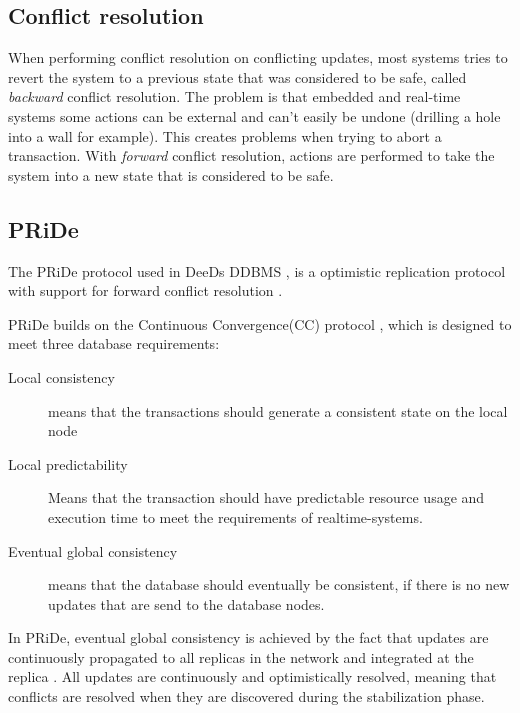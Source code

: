\subsection{Conflict resolution} %
\label{sub:conflict_resolution}

When performing conflict resolution on conflicting updates, most systems tries to revert the system to a previous state that was considered to be safe, called \emph{backward} conflict resolution. The problem is that embedded and real-time systems some actions can be external and can't easily be undone (drilling a hole into a wall for example). This creates problems when trying to abort a transaction. 
With \emph{forward} conflict resolution, actions are performed to take the system into a new state that is considered to be safe.      


\subsection{PRiDe}
\label{sub:pride}

The PRiDe protocol used in DeeDs DDBMS \cite[]{deeds}, is a optimistic replication protocol with support for forward conflict resolution \cite[]{Syber2007}. 

PRiDe builds on the Continuous Convergence(CC) protocol \cite[]{consistency2005}, which is designed to meet three database requirements: 
\begin{description}
	\item[Local consistency] means that the transactions should generate a consistent state on the local node
	\item[Local predictability] Means that the transaction should have predictable resource usage and execution time to meet the requirements of realtime-systems.  
	\item[Eventual global consistency] means that the database should eventually be consistent, if there is no new updates that are send to the database nodes.  
\end{description}    

In PRiDe, eventual global consistency is achieved by the fact that  updates are continuously propagated to all replicas in the network and integrated at the replica . All updates are continuously and optimistically resolved, meaning that conflicts are resolved when they are discovered during the stabilization phase. 
